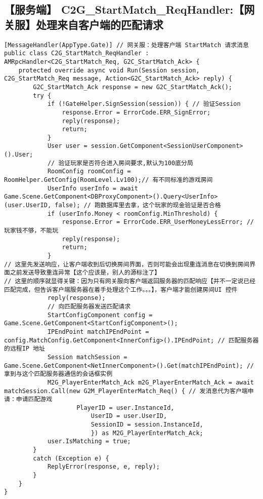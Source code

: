 \documentclass[9pt, b5paper]{article}
\begin{document}
\subsection{【服务端】 C2G\_StartMatch\_ReqHandler:【网关服】处理来自客户端的匹配请求}
\label{sec-1-2}
\begin{verbatim}
[MessageHandler(AppType.Gate)] // 网关服：处理客户端 StartMatch 请求消息
public class C2G_StartMatch_ReqHandler : AMRpcHandler<C2G_StartMatch_Req, G2C_StartMatch_Ack> {
    protected override async void Run(Session session, C2G_StartMatch_Req message, Action<G2C_StartMatch_Ack> reply) {
        G2C_StartMatch_Ack response = new G2C_StartMatch_Ack();
        try {
            if (!GateHelper.SignSession(session)) { // 验证Session
                response.Error = ErrorCode.ERR_SignError;
                reply(response);
                return;
            }
            User user = session.GetComponent<SessionUserComponent>().User;
            // 验证玩家是否符合进入房间要求,默认为100底分局
            RoomConfig roomConfig = RoomHelper.GetConfig(RoomLevel.Lv100);// 有不同标准的游戏房间
            UserInfo userInfo = await Game.Scene.GetComponent<DBProxyComponent>().Query<UserInfo>(user.UserID, false); // 跑数据库里去拿，这个玩家的现金验证是否合格
            if (userInfo.Money < roomConfig.MinThreshold) {
                response.Error = ErrorCode.ERR_UserMoneyLessError; // 玩家钱不够，不能玩
                reply(response);
                return;
            }
// 这里先发送响应，让客户端收到后切换房间界面，否则可能会出现重连消息在切换到房间界面之前发送导致重连异常【这个应该是，别人的源标注了】
// 这里的顺序就显得关键：因为只有网关服向客户端返回服务器的匹配响应【并不一定说已经匹配完成，但告诉客户端服务器在着手处理这个工作。。。】，客户端才能创建房间UI 控件
            reply(response); 
            // 向匹配服务器发送匹配请求
            StartConfigComponent config = Game.Scene.GetComponent<StartConfigComponent>();
            IPEndPoint matchIPEndPoint = config.MatchConfig.GetComponent<InnerConfig>().IPEndPoint; // 匹配服务器的远程IP 地址
            Session matchSession = Game.Scene.GetComponent<NetInnerComponent>().Get(matchIPEndPoint); // 拿到与这个匹配服务器通信的会话框实例
            M2G_PlayerEnterMatch_Ack m2G_PlayerEnterMatch_Ack = await matchSession.Call(new G2M_PlayerEnterMatch_Req() { // 发消息代为客户端申请：申请匹配游戏
                    PlayerID = user.InstanceId,
                        UserID = user.UserID,
                        SessionID = session.InstanceId,
                        }) as M2G_PlayerEnterMatch_Ack;
            user.IsMatching = true;
        }
        catch (Exception e) {
            ReplyError(response, e, reply);
        }
    }
}
\end{verbatim}
\end{document}
